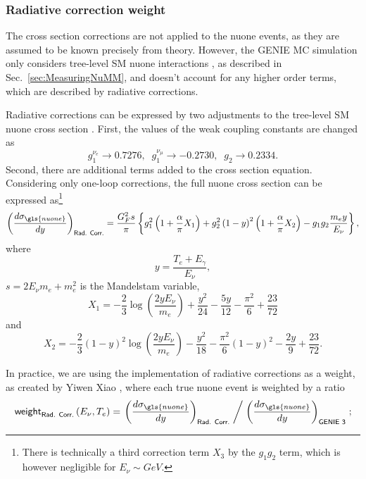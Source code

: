 \subsubsection*{Radiative correction weight}
The cross section corrections are not applied to the \gls{nuone} events, as they are assumed to be known precisely from theory. However, the GENIE \gls{MC} simulation only considers tree-level \gls{SM} \gls{nuone} interactions \cite{NOVA-doc-56383}, as described in Sec.~\ref{sec:MeasuringNuMM}, and doesn't account for any higher order terms, which are described by radiative corrections.

Radiative corrections can be expressed by two adjustments to the tree-level \gls{SM} \gls{nuone} cross section \cite{MinervaNuoneFluxConstraint2019.pdf}. First, the values of the weak coupling constants are changed as \cite{NuoneRadCorrConstants2013.pdf}
\begin{equation}
g_1^{\nu_e}\rightarrow 0.7276,\; \; g_1^{\nu_\mu}\rightarrow -0.2730,\; \;  g_2\rightarrow 0.2334.
\end{equation}
Second, there are additional terms added to the cross section equation. Considering only one-loop corrections, the full \gls{nuone} cross section can be expressed as\footnote{There is technically a third correction term $X_3$ by the $g_1g_2$ term, which is however negligible for $E_\nu\sim\unit{GeV}$.} \cite{NuoneRadCorrEquation1984.pdf}
\begin{equation}
\left(\frac{d\sigma_{\gls{nuone}}}{dy}\right)_{\textsf{Rad. Corr.}}=
\frac{G_F^2s}{\pi}\left\lbrace
g_1^2\left(1+\frac{\alpha}{\pi}X_1\right)+
g_2^2\left(1-y\right)^2\left(1+\frac{\alpha}{\pi}X_2\right)-
g_1 g_2\frac{m_ey}{E_{\nu}}\right\rbrace,
\end{equation}
where
\begin{equation}
y=\frac{T_e+E_\gamma}{E_\nu},
\end{equation}
$s=2E_\nu m_e+m_e^2$ is the Mandelstam variable,
\begin{equation}
X_1=-\frac{2}{3}\log\left(\frac{2yE_\nu}{m_e}\right)+\frac{y^2}{24}-\frac{5y}{12}-\frac{\pi^2}{6}+\frac{23}{72}
\end{equation}
and
\begin{equation}
X_2=-\frac{2}{3}\left(1-y\right)^2\log\left(\frac{2yE_\nu}{m_e}\right)-\frac{y^2}{18}-\frac{\pi^2}{6}\left(1-y\right)^2-\frac{2y}{9}+\frac{23}{72}.
\end{equation}

In practice, we are using the implementation of radiative corrections as a weight, as created by Yiwen Xiao \cite{NOVA-doc-56383}, where each true \gls{nuone} event is weighted by a ratio
\begin{equation}
\textsf{weight}_{\textsf{Rad. Corr.}}\left(E_\nu,T_e\right) = \left.\left(\frac{d\sigma_{\gls{nuone}}}{dy}\right)_{\textsf{Rad. Corr.}}\; \middle/\; \left(\frac{d\sigma_{\gls{nuone}}}{dy}\right)_{\textsf{GENIE 3}}\right.;
\end{equation}

